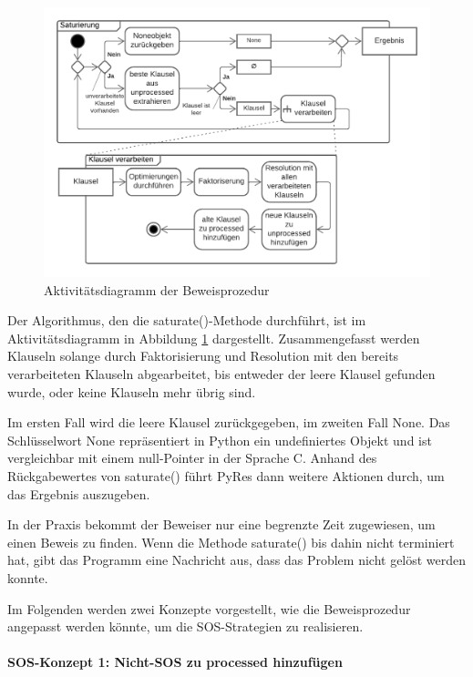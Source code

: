 \begin{figure}
	\centering
	\includegraphics[width=1\linewidth]{images/Lucid/ActivityProof}
	\caption{Aktivitätsdiagramm der Beweisprozedur}
	\label{fig:activityproof}
\end{figure}


Der Algorithmus, den die saturate()-Methode durchführt, ist im Aktivitätsdiagramm in Abbildung \ref{fig:activityproof} dargestellt. Zusammengefasst werden Klauseln solange durch Faktorisierung und Resolution mit den bereits verarbeiteten Klauseln abgearbeitet, bis entweder der leere Klausel gefunden wurde, oder keine Klauseln mehr übrig sind.

Im ersten Fall wird die leere Klausel zurückgegeben, im zweiten Fall None. Das Schlüsselwort None repräsentiert in Python ein undefiniertes Objekt und ist vergleichbar mit einem null-Pointer in der Sprache C. Anhand des Rückgabewertes von saturate() führt PyRes dann weitere Aktionen durch, um das Ergebnis auszugeben.

In der Praxis bekommt der Beweiser nur eine begrenzte Zeit zugewiesen, um einen Beweis zu finden. Wenn die Methode saturate() bis dahin nicht terminiert hat, gibt das Programm eine Nachricht aus, dass das Problem nicht gelöst werden konnte.

Im Folgenden werden zwei Konzepte vorgestellt, wie die Beweisprozedur angepasst werden könnte, um die SOS-Strategien zu realisieren.

\paragraph{SOS-Konzept 1: Nicht-SOS zu processed hinzufügen}

